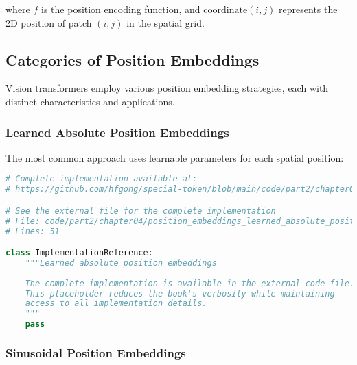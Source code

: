 where $f$ is the position encoding function, and $\text{coordinate}(i,j)$ represents the 2D position of patch $(i,j)$ in the spatial grid.

\subsection{Categories of Position Embeddings}

Vision transformers employ various position embedding strategies, each with distinct characteristics and applications.
\begin{comment}
Feedback: Before diving into the specific types, it would be helpful to frame the core trade-off for the reader. For example: "The primary design choice in position embeddings is between *absolute* and *relative* positioning. Absolute embeddings learn a specific vector for each grid location (e.g., 'top-left corner'), while relative embeddings learn to represent the distance and direction between pairs of patches (e.g., 'two patches to the right'). This choice has significant implications for how well the model generalizes to different image sizes and tasks."
\end{comment}

\subsubsection{Learned Absolute Position Embeddings}

The most common approach uses learnable parameters for each spatial position:

\begin{lstlisting}[language=Python, caption={Learned absolute position embeddings}]
# Complete implementation available at:
# https://github.com/hfgong/special-token/blob/main/code/part2/chapter04/position_embeddings_learned_absolute_position_embe.py

# See the external file for the complete implementation
# File: code/part2/chapter04/position_embeddings_learned_absolute_position_embe.py
# Lines: 51

class ImplementationReference:
    """Learned absolute position embeddings
    
    The complete implementation is available in the external code file.
    This placeholder reduces the book's verbosity while maintaining
    access to all implementation details.
    """
    pass
\end{lstlisting}

\subsubsection{Sinusoidal Position Embeddings}

